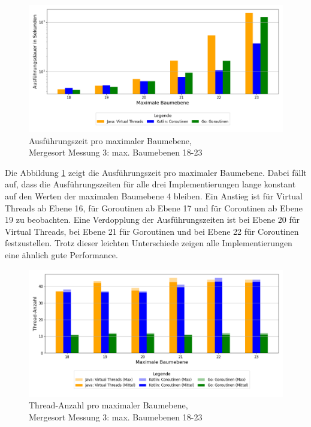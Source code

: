 \documentclass[fontsize=12pt,paper=a4,twoside=semi,parskip=half-,headsepline,headinclude]{scrreprt}
\begin{document}
\begin{figure}[H]
	\centering
	\includegraphics[scale=0.5]{figures/mergesort/Maximalebauebenen1-23_vcg/execution_time_plot.png}
	\caption{Ausführungszeit pro maximaler Baumebene,\\ Mergesort Messung 3: max. Baumebenen 18-23}
	\label{fig:ms1-23Zeit}
\end{figure}

Die Abbildung \ref{fig:ms1-23Zeit} zeigt die Ausführungszeit pro maximaler Baumebene. Dabei fällt auf, dass die Ausführungszeiten für alle drei Implementierungen lange konstant auf den Werten der maximalen Baumebene 4 bleiben. Ein Anstieg ist für Virtual Threads ab Ebene 16, für Goroutinen ab Ebene 17 und für Coroutinen ab Ebene 19 zu beobachten. Eine Verdopplung der Ausführungszeiten ist bei Ebene 20 für Virtual Threads, bei Ebene 21 für Goroutinen und bei Ebene 22 für Coroutinen festzustellen. Trotz dieser leichten Unterschiede zeigen alle Implementierungen eine ähnlich gute Performance.

\begin{figure}[H]
	\centering
	\includegraphics[scale=0.5]{figures/mergesort/Maximalebauebenen1-23_vcg/num_threads_bar_plot.png}
	\caption{Thread-Anzahl pro maximaler Baumebene,\\ Mergesort Messung 3: max. Baumebenen 18-23}
	\label{fig:ms1-23Threads}
\end{figure}
\end{document}
